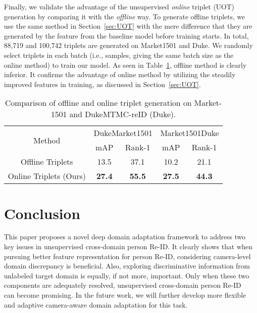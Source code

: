 \documentclass[10pt,twocolumn,letterpaper]{article}
\begin{document}
 
Finally, we validate the advantage of the unsupervised \textit{online} triplet (UOT) generation by comparing it with the \textit{offline} way. To generate offline triplets, we use the same method in Section~\ref{sec:UOT} with the mere difference that they are generated by the feature from the baseline model before training starts.
In total, 88,719 and 100,742 triplets are generated on Market1501 and Duke. We randomly select  triplets in each batch (i.e.,  samples, giving the same batch size as the online method) to train our model. As seen in Table~\ref{tab09}, offline method is clearly inferior. It confirms the advantage of online method by utilizing the steadily improved features in training, as discussed in Section~\ref{sec:UOT}.
 
\begin{table}[htbp]
 \centering 
 \caption{Comparison of offline and online triplet generation on Market-1501 and DukeMTMC-reID (Duke).}
  \begin{adjustbox}{width=0.48\textwidth}
   \begin{tabular}{|c|cc|cc|}
   \toprule
   \multirow{2}[1]{*}{Method} & \multicolumn{2}{c|}{DukeMarket1501} & \multicolumn{2}{c|}{Market1501Duke} \\
\cmidrule{2-5}         & mAP  & Rank-1 & mAP  & Rank-1 \\
     \midrule
   Offline Triplets & 13.5 & 37.1 & 10.2 & 21.1 \\
   \midrule
   Online Triplets (Ours) & \textcolor[rgb]{ 1, 0, 0}{\textbf{27.4}} & \textcolor[rgb]{ 1, 0, 0}{\textbf{55.5}} & \textcolor[rgb]{ 1, 0, 0}{\textbf{27.5}} & \textcolor[rgb]{ 1, 0, 0}{\textbf{44.3}} \\
   \bottomrule
   \end{tabular}\end{adjustbox}
 \label{tab09}\vspace*{-20pt}
\end{table}

\section{Conclusion}
This paper proposes a novel deep domain adaptation framework to address two key issues in unsupervised cross-domain person Re-ID. It clearly shows that when pursuing better feature representation for person Re-ID, considering camera-level domain discrepancy is beneficial. Also, exploring discriminative information from unlabeled target domain is equally, if not more, important. Only when these two components are adequately resolved, unsupervised cross-domain person Re-ID can become promising. In the future work, we will further develop more flexible and adaptive camera-aware domain adaptation for this task.
 
\end{document}
